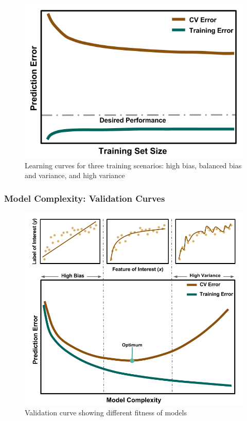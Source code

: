 \begin{frame}
\begin{figure}[h!]
\begin{minipage}{0.35\textwidth}
      \includegraphics[width=\linewidth]{./figures/LearningCurve-variance.png}
    \end{minipage}
    \caption{Learning curves for three training scenarios: high bias, balanced bias and variance, and high variance}
  \end{figure}
\end{frame}

\begin{frame}
  \frametitle{Model Complexity: Validation Curves}
  \begin{figure}[h!]
    \centering
    \includegraphics[height=0.7\textheight]{./figures/ValidationCurve.png}
    \caption{Validation curve showing different fitness of models}
  \end{figure}
\end{frame}

